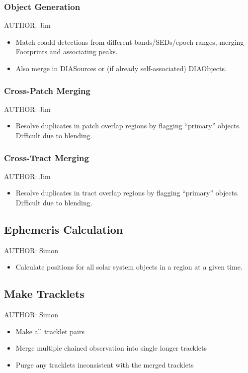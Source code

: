 \subsubsection{Object Generation}
AUTHOR: Jim
\begin{itemize}
\item Match coadd detections from different bands/SEDs/epoch-ranges, merging Footprints and associating peaks.
\item Also merge in DIASources or (if already self-associated) DIAObjects.
\end{itemize}

\subsubsection{Cross-Patch Merging}
AUTHOR: Jim
\begin{itemize}
\item Resolve duplicates in patch overlap regions by flagging ``primary'' objects.  Difficult due to blending.
\end{itemize}

\subsubsection{Cross-Tract Merging}
AUTHOR: Jim
\begin{itemize}
\item Resolve duplicates in tract overlap regions by flagging ``primary'' objects.  Difficult due to blending.
\end{itemize}

\subsection{Ephemeris Calculation}
AUTHOR: Simon
\begin{itemize}
\item Calculate positions for all solar system objects in a region at a given time.
\end{itemize}

\subsection{Make Tracklets}
AUTHOR: Simon
\begin{itemize}
\item Make all tracklet pairs
\item Merge multiple chained observation into single longer tracklets
\item Purge any tracklets inconsistent with the merged tracklets
\end{itemize}


